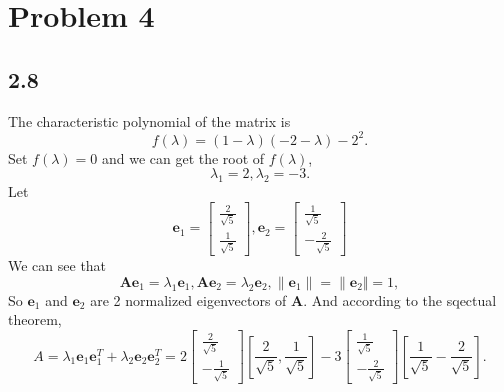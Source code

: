 \message{ !name(hw1.tex)}\documentclass{article}
\begin{document}
\section*{Problem 4}
\subsection*{2.8}
The characteristic polynomial of the matrix is
\begin{equation*}
  f(\lambda) = (1-\lambda)(-2-\lambda) - 2^2.
\end{equation*}
Set $f(\lambda) = 0$ and we can get the root of $f(\lambda)$,
\begin{equation*}
  \lambda_1 = 2, \lambda_2 = -3.
\end{equation*}
Let
\begin{equation*}
  \mathbf{e}_1 = \left[
    \begin{matrix}
      \frac{2}{\sqrt{5}}\\
      \frac{1}{\sqrt{5}}
    \end{matrix}\right],
  \mathbf{e}_2 = \left[
    \begin{matrix}
      \frac{1}{\sqrt{5}}\\
      -\frac{2}{\sqrt{5}}
    \end{matrix}\right]
\end{equation*}
We can see that
\begin{equation*}
  \mathbf{Ae}_1 = \lambda_1\mathbf{e}_1, \mathbf{Ae}_2 = \lambda_2\mathbf{e}_2, \lVert \mathbf{e}_1 \rVert = \lVert \mathbf{e}_2 \Vert = 1,
\end{equation*}
So $\mathbf{e}_1$ and $\mathbf{e}_2$ are 2 normalized eigenvectors of $\mathbf{A}$.
And according to the sqectual theorem,
\begin{equation*}
  A = \lambda_1\mathbf{e}_1\mathbf{e}_1^T + \lambda_2\mathbf{e}_2\mathbf{e}_2^T = 2\left[
    \begin{matrix}
      \frac{2}{\sqrt{5}}\\
      -\frac{1}{\sqrt{5}}
    \end{matrix}\right]\left[\frac{2}{\sqrt{5}}, \frac{1}{\sqrt{5}}\right] - 3\left[
    \begin{matrix}
      \frac{1}{\sqrt{5}}\\
      -\frac{2}{\sqrt{5}}
    \end{matrix}\right]\left[\frac{1}{\sqrt{5}} - \frac{2}{\sqrt{5}}\right].
\end{equation*}
\end{document}

